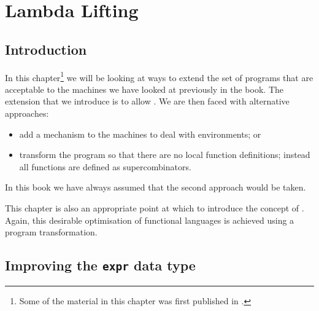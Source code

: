 \chapter{Lambda Lifting}
\label{sect:lambda-lift}

\section{Introduction}

In this chapter\footnote{Some of the material in this chapter was 
first published in \cite{SPELambdaLift}.}
we will be looking at ways to extend the set of
programs that are acceptable to the machines we have looked at
previously in the book.  The extension that we introduce is to allow
.  We are then faced with
alternative approaches:
\begin{itemize}
\item add a mechanism to the machines to deal with environments; or
\item transform the program so that there are no local function
definitions; instead all functions are defined as supercombinators.
\end{itemize}
In this book we have always assumed that the second approach would be
taken.

This chapter is also an appropriate point at which to introduce
the concept of .
Again, this desirable optimisation of
functional languages is achieved using a program transformation.
%

\section{Improving the \mbox{\tt expr} data type}

